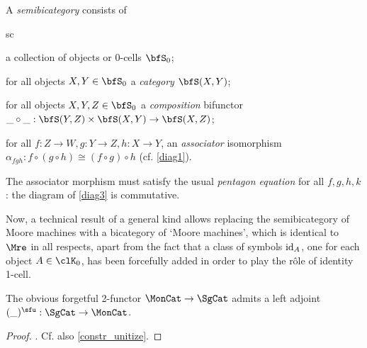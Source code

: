 \begin{definition}  \label{def_semibicat} 
  A \emph{semibicategory} consists of
  \begin{enumtag}{sc}
    \item a collection of objects or 0-cells $\bfS_0$;
    \item for all objects $X,Y\in\bfS_0$ a \emph{category} $\bfS(X,Y)$;
    \item \label{bicomp} for all objects $X,Y,Z\in\bfS_0$ a \emph{composition} bifunctor $\_\circ\_ : \bfS(Y,Z)\times\bfS(X,Y)\to \bfS(X,Z)$;
    \item for all $f:Z\to W,g:Y\to Z,h:X\to Y$, an \emph{associator} isomorphism $\alpha_{fgh} : f\circ (g\circ h) \cong (f\circ g)\circ h$ (cf. \eqref{diag1}).
  \end{enumtag}
  The associator morphism must satisfy the usual \emph{pentagon equation} for all $f,g,h,k$: the diagram of \eqref{diag3} is commutative.
\end{definition}
Now, a technical result of a general kind allows replacing the semibicategory of Moore machines with a bicategory of `Moore machines', which is identical to $\Mre$ in all respects, apart from the fact that a class of symbols $\text{id}_A$, one for each object $A\in\clK_0$, has been forcefully added in order to play the r\^ole of identity 1-cell.
\begin{theorem}\label{unitize_thm}
  The obvious forgetful 2-functor $\MonCat\to \SgCat$ admits a left adjoint $(\_)^\un : \SgCat \to \MonCat$.
\end{theorem}
\begin{proof}
  . Cf. also \autoref{constr_unitize}.
\end{proof}